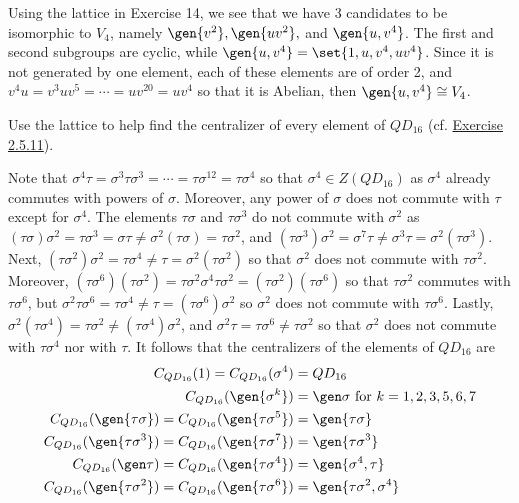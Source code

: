 \begin{sol}
    Using the lattice in Exercise 14, we see that we have 3 candidates to be isomorphic to $V_4$, namely $\gen{v^2}, \gen{uv^2},$ and $\gen{u, v^4}$. The first and second subgroups are cyclic, while $\gen{u, v^4} = \set{1, u, v^4, uv^4}$. Since it is not generated by one element, each of these elements are of order 2, and $v^4u = v^3uv^5 = \cdots = uv^{20} = uv^4$ so that it is Abelian, then $\gen{u, v^4} \cong V_4$.
\end{sol}

\begin{exercise}\label{ex2.5.18}
    Use the lattice to help find the centralizer of every element of $QD_{16}$ (cf. \hyperref[ex2.5.11]{Exercise 2.5.11}).
\end{exercise}

\begin{sol}
    Note that $\sigma^4\tau = \sigma^3\tau\sigma^3 = \cdots = \tau\sigma^{12} = \tau\sigma^4$ so that $\sigma^4 \in Z(QD_{16})$ as $\sigma^4$ already commutes with powers of $\sigma$. Moreover, any power of $\sigma$ does not commute with $\tau$ except for $\sigma^4$. The elements $\tau\sigma$ and $\tau\sigma^3$ do not commute with $\sigma^2$ as $(\tau\sigma)\sigma^2 = \tau\sigma^3 = \sigma\tau \neq \sigma^2(\tau\sigma) = \tau\sigma^2$, and $(\tau\sigma^3)\sigma^2 = \sigma^7\tau \neq \sigma^3\tau = \sigma^2(\tau\sigma^3)$. Next, $(\tau\sigma^2)\sigma^2 = \tau\sigma^4 \neq \tau = \sigma^2(\tau\sigma^2)$ so that $\sigma^2$ does not commute with $\tau\sigma^2$. Moreover, $(\tau\sigma^6)(\tau\sigma^2) = \tau\sigma^2\sigma^4\tau\sigma^2 = (\tau\sigma^2)(\tau\sigma^6)$ so that $\tau\sigma^2$ commutes with $\tau\sigma^6$, but $\sigma^2\tau\sigma^6 = \tau\sigma^4 \neq \tau = (\tau\sigma^6)\sigma^2$ so $\sigma^2$ does not commute with $\tau\sigma^6$. Lastly, $\sigma^2(\tau\sigma^4) = \tau\sigma^2 \neq (\tau\sigma^4)\sigma^2$, and $\sigma^2\tau = \tau\sigma^6 \neq \tau\sigma^2$ so that $\sigma^2$ does not commute with $\tau\sigma^4$ nor with $\tau$. It follows that the centralizers of the elements of $QD_{16}$ are
    \begin{align*}
        C_{QD_{16}}(1) = C_{QD_{16}}(\sigma^4) & = QD_{16} \\
        C_{QD_{16}}(\gen{\sigma^k}) & = \gen\sigma \text{ for $k = 1, 2, 3, 5, 6, 7$} \\
        C_{QD_{16}}(\gen{\tau\sigma}) = C_{QD_{16}}(\gen{\tau\sigma^5}) & = \gen{\tau\sigma} \\
        C_{QD_{16}}(\gen{\tau\sigma^3}) = C_{QD_{16}}(\gen{\tau\sigma^7}) & = \gen{\tau\sigma^3} \\
        C_{QD_{16}}(\gen\tau) = C_{QD_{16}}(\gen{\tau\sigma^4}) & = \gen{\sigma^4, \tau} \\
        C_{QD_{16}}(\gen{\tau\sigma^2}) = C_{QD_{16}}(\gen{\tau\sigma^6}) & = \gen{\tau\sigma^2, \sigma^4}
    \end{align*}
\end{sol}

